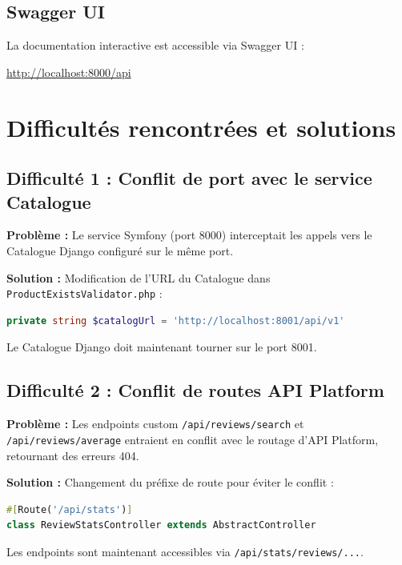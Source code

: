 \documentclass[11pt,a4paper]{article}
\begin{document}
\subsection{Swagger UI}

La documentation interactive est accessible via Swagger UI :

\begin{center}
\url{http://localhost:8000/api}
\end{center}


\section{Difficultés rencontrées et solutions}

\subsection{Difficulté 1 : Conflit de port avec le service Catalogue}

\textbf{Problème :} Le service Symfony (port 8000) interceptait les appels vers le Catalogue Django configuré sur le même port.

\textbf{Solution :} Modification de l'URL du Catalogue dans \texttt{ProductExistsValidator.php} :

\begin{lstlisting}[language=PHP]
private string $catalogUrl = 'http://localhost:8001/api/v1'
\end{lstlisting}

Le Catalogue Django doit maintenant tourner sur le port 8001.

\subsection{Difficulté 2 : Conflit de routes API Platform}

\textbf{Problème :} Les endpoints custom \texttt{/api/reviews/search} et \texttt{/api/reviews/average} entraient en conflit avec le routage d'API Platform, retournant des erreurs 404.

\textbf{Solution :} Changement du préfixe de route pour éviter le conflit :

\begin{lstlisting}[language=PHP]
#[Route('/api/stats')]
class ReviewStatsController extends AbstractController
\end{lstlisting}

Les endpoints sont maintenant accessibles via \texttt{/api/stats/reviews/...}.
\end{document}
